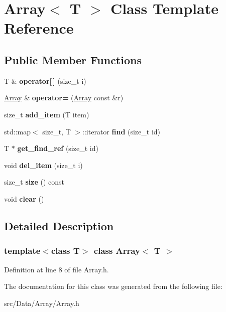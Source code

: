 \hypertarget{class_array}{
\section{Array$<$ T $>$ Class Template Reference}
\label{class_array}
}
\subsection*{Public Member Functions}
\begin{DoxyCompactItemize}
\item 
\hypertarget{class_array_a69261a311adc661f7c6aff81c69af5db}{
T \& {\bfseries operator\mbox{[}$\,$\mbox{]}} (size\_\-t i)}
\label{class_array_a69261a311adc661f7c6aff81c69af5db}

\item 
\hypertarget{class_array_ab8a1cc7e264a8c2bd9a3d467b72aafe1}{
\hyperlink{class_array}{Array} \& {\bfseries operator=} (\hyperlink{class_array}{Array} const \&r)}
\label{class_array_ab8a1cc7e264a8c2bd9a3d467b72aafe1}

\item 
\hypertarget{class_array_a4e3b0afea4d718b963e8f3986bac10cf}{
size\_\-t {\bfseries add\_\-item} (T item)}
\label{class_array_a4e3b0afea4d718b963e8f3986bac10cf}

\item 
\hypertarget{class_array_a9ddf1f8ee3569bdd11cef33141585d79}{
std::map$<$ size\_\-t, T $>$::iterator {\bfseries find} (size\_\-t id)}
\label{class_array_a9ddf1f8ee3569bdd11cef33141585d79}

\item 
\hypertarget{class_array_a00cf17af426633d75b9103d5620e1612}{
T $\ast$ {\bfseries get\_\-find\_\-ref} (size\_\-t id)}
\label{class_array_a00cf17af426633d75b9103d5620e1612}

\item 
\hypertarget{class_array_a298b0c967be0537583d753e984b5c8a8}{
void {\bfseries del\_\-item} (size\_\-t i)}
\label{class_array_a298b0c967be0537583d753e984b5c8a8}

\item 
\hypertarget{class_array_aa1bdb396081a4900d33e7d36b86cc8ef}{
size\_\-t {\bfseries size} () const }
\label{class_array_aa1bdb396081a4900d33e7d36b86cc8ef}

\item 
\hypertarget{class_array_ac19d187420e7bd8a80c939201e3c2824}{
void {\bfseries clear} ()}
\label{class_array_ac19d187420e7bd8a80c939201e3c2824}

\end{DoxyCompactItemize}


\subsection{Detailed Description}
\subsubsection*{template$<$class T$>$ class Array$<$ T $>$}



Definition at line 8 of file Array.h.



The documentation for this class was generated from the following file:\begin{DoxyCompactItemize}
\item 
src/Data/Array/Array.h\end{DoxyCompactItemize}
